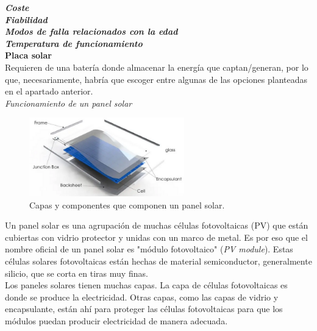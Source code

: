 \documentclass[12pt]{article}
\begin{document}
	\noindent \textit{\textbf{Coste}}\\
	
	\noindent \textit{\textbf{Fiabilidad}}\\		
	
	\noindent \textit{\textbf{Modos de falla relacionados con la edad}}\\	
	
	\noindent \textit{\textbf{Temperatura de funcionamiento}}\\	
	
	\noindent \textbf{Placa solar}\\ 
	
	\noindent Requieren de una batería donde almacenar la energía que captan/generan, por lo que, necesariamente, habría que escoger entre algunas de las opciones planteadas en el apartado anterior. \\
	
	\noindent \textit{Funcionamiento de un panel solar}
	
	\begin{figure}[h]
		\begin{center}
			\includegraphics[width=0.6\textwidth]{img/layersSolarPanel.png}
			\caption{Capas y componentes que componen un panel solar.}
			\label{fig: capas panel solar}
		\end{center}
	\end{figure}

	\pagebreak
	
	\noindent Un panel solar es una agrupación de muchas células fotovoltaicas (PV) que están cubiertas con vidrio protector y unidas con un marco de metal. Es por eso que el nombre oficial de un panel solar es "módulo fotovoltaico" (\textit{PV module}). Estas células solares fotovoltaicas están hechas de material semiconductor, generalmente silicio, que se corta en tiras muy finas.\\
	
	\noindent Los paneles solares tienen muchas capas. La capa de células fotovoltaicas es donde se produce la electricidad. Otras capas, como las capas de vidrio y encapsulante, están ahí para proteger las células fotovoltaicas para que los módulos puedan producir electricidad de manera adecuada.\\
	
\end{document}
